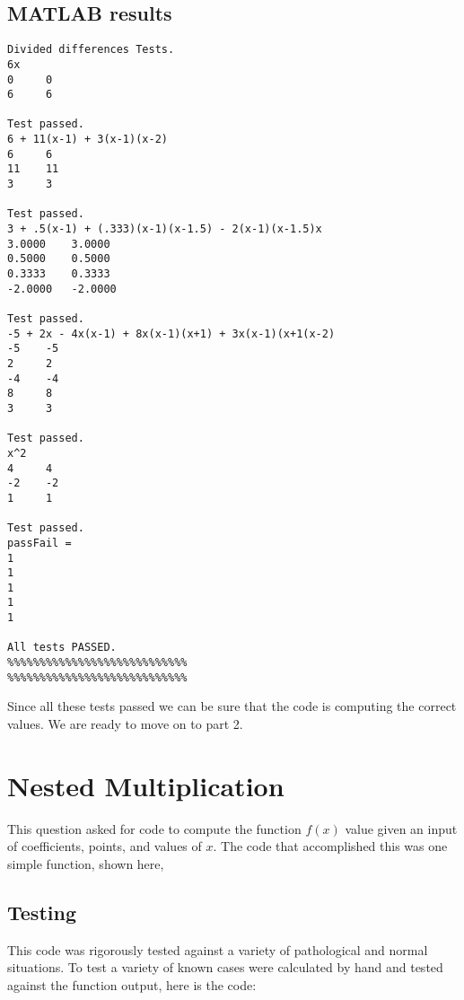 \documentclass[]{article}
\begin{document}
\subsection*{MATLAB results}
\begin{verbatim}
Divided differences Tests.
6x
0     0
6     6

Test passed.
6 + 11(x-1) + 3(x-1)(x-2)
6     6
11    11
3     3

Test passed.
3 + .5(x-1) + (.333)(x-1)(x-1.5) - 2(x-1)(x-1.5)x
3.0000    3.0000
0.5000    0.5000
0.3333    0.3333
-2.0000   -2.0000

Test passed.
-5 + 2x - 4x(x-1) + 8x(x-1)(x+1) + 3x(x-1)(x+1(x-2)
-5    -5
2     2
-4    -4
8     8
3     3

Test passed.
x^2
4     4
-2    -2
1     1

Test passed.
passFail =
1
1
1
1
1

All tests PASSED.
%%%%%%%%%%%%%%%%%%%%%%%%%%%%
%%%%%%%%%%%%%%%%%%%%%%%%%%%%
\end{verbatim}	
Since all these tests passed we can be sure that the code is computing the correct values. We are ready to move on to part 2. 

\section{Nested Multiplication} This question asked for code to compute the function $ f(x) $ value given an input of coefficients, points, and values of $ x $. The code that accomplished this was one simple function,  shown here, 


\subsection*{Testing} This code was rigorously tested against a variety of pathological and normal situations. To test a variety of known cases were calculated by hand and tested against the function output, here is the code: 
\end{document}
